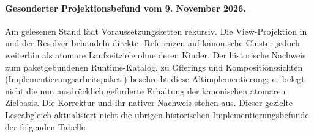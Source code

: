 \paragraph{Gesonderter Projektionsbefund vom 9. November 2026.}
Am gelesenen Stand  lädt
 Voraussetzungsketten rekursiv.
Die View-Projektion in  und der Resolver
behandeln direkte -Referenzen auf kanonische Cluster
jedoch weiterhin als atomare Laufzeitziele ohne deren Kinder.
Der historische Nachweis zum paketgebundenen Runtime-Katalog, zu Offerings
und Kompositionssichten (Implementierungsarbeitspaket
) beschreibt diese Altimplementierung;
er belegt nicht die nun ausdrücklich geforderte Erhaltung der kanonischen
atomaren Zielbasis. Die Korrektur und ihr nativer Nachweis stehen aus.
Dieser gezielte Leseabgleich aktualisiert nicht die übrigen historischen
Implementierungsbefunde der folgenden Tabelle.

